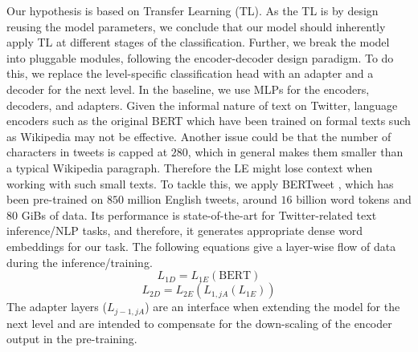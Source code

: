 \documentclass[11pt,a4paper]{article}
\begin{document}
Our hypothesis is based on Transfer Learning (TL). As the TL is by design reusing the model parameters, we conclude that our model should inherently apply TL at different stages of the classification. Further, we break the model into pluggable modules, following the encoder-decoder design paradigm. To do this, we replace the level-specific classification head with an adapter and a decoder for the next level. In the baseline, we use MLPs for the encoders, decoders, and adapters.
Given the informal nature of text on Twitter, language encoders such as the original BERT \cite{devlin2019bert} which have been trained on formal texts such as Wikipedia may not be effective. Another issue could be that the number of characters in tweets is capped at $280$, which in general makes them smaller than a typical Wikipedia paragraph. Therefore the LE might lose context when working with such small texts. To tackle this, we apply BERTweet \cite{bertweet}, which has been pre-trained on $850$ million English tweets, around $16$ billion word tokens and $80$ GiBs of data. Its performance is state-of-the-art for Twitter-related text inference/NLP tasks, and therefore, it generates appropriate dense word embeddings for our task.
The following equations give a layer-wise flow of data during the inference/training.
\begin{equation}
    L_{1D} = L_{1E}(\text{BERT})
\end{equation}
\begin{equation}
    L_{2D} = L_{2 E}(L_{1,j A}(L_{1 E}))
\end{equation}
The adapter layers ($L_{j-1,j A}$) are an interface when extending the model for the next level and are intended to compensate for the down-scaling of the encoder output in the pre-training.
\end{document}
